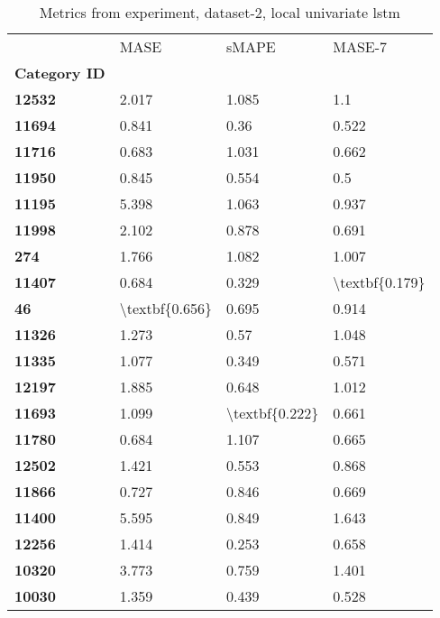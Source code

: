 \begin{table}[h]
\centering
\caption{Metrics from experiment, dataset-2, local univariate lstm}
\label{table:local-univariate-lstm-dataset-2}
\begin{tabular}{llll}
\toprule
{} &            MASE &           sMAPE &          MASE-7 \\
\textbf{Category ID} &                 &                 &                 \\
\midrule
\textbf{12532      } &           2.017 &           1.085 &             1.1 \\
\textbf{11694      } &           0.841 &            0.36 &           0.522 \\
\textbf{11716      } &           0.683 &           1.031 &           0.662 \\
\textbf{11950      } &           0.845 &           0.554 &             0.5 \\
\textbf{11195      } &           5.398 &           1.063 &           0.937 \\
\textbf{11998      } &           2.102 &           0.878 &           0.691 \\
\textbf{274        } &           1.766 &           1.082 &           1.007 \\
\textbf{11407      } &           0.684 &           0.329 &  \textbackslash textbf\{0.179\} \\
\textbf{46         } &  \textbackslash textbf\{0.656\} &           0.695 &           0.914 \\
\textbf{11326      } &           1.273 &            0.57 &           1.048 \\
\textbf{11335      } &           1.077 &           0.349 &           0.571 \\
\textbf{12197      } &           1.885 &           0.648 &           1.012 \\
\textbf{11693      } &           1.099 &  \textbackslash textbf\{0.222\} &           0.661 \\
\textbf{11780      } &           0.684 &           1.107 &           0.665 \\
\textbf{12502      } &           1.421 &           0.553 &           0.868 \\
\textbf{11866      } &           0.727 &           0.846 &           0.669 \\
\textbf{11400      } &           5.595 &           0.849 &           1.643 \\
\textbf{12256      } &           1.414 &           0.253 &           0.658 \\
\textbf{10320      } &           3.773 &           0.759 &           1.401 \\
\textbf{10030      } &           1.359 &           0.439 &           0.528 \\
\bottomrule
\end{tabular}
\end{table}
